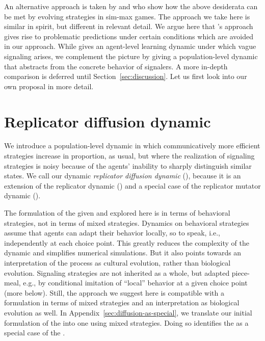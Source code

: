 \documentclass[fleqn,reqno,10pt]{article}
\newcommand{\rd}{\acro{rd}} %
\newcommand{\rmd}{\acro{rmd}} %
\newcommand{\rdd}{\acro{rdd}} %
\begin{document}
An alternative approach is taken by
\citet{FrankeJager2010:Vagueness-Signa} and
\citet{OConnor2013:The-Evolution-o} who show how the above desiderata
can be met by evolving strategies in sim-max games. The approach we
take here is similar in spirit, but different in relevant detail. We
argue here that \citeauthor{FrankeJager2010:Vagueness-Signa}'s
approach gives rise to problematic predictions under certain
conditions which are avoided in our approach. While
\citeauthor{OConnor2013:The-Evolution-o} gives an agent-level learning
dynamic under which vague signaling arises, we complement the picture
by giving a population-level dynamic that abstracts from the concrete
behavior of signalers. A more in-depth comparison is deferred until
Section~\ref{sec:discussion}. Let us first look into our own proposal
in more detail.



\section{Replicator diffusion dynamic}
\label{sec:repl-diff-dynam}

We introduce a population-level dynamic in which communicatively more
efficient strategies increase in proportion, as usual, but where the
realization of signaling strategies is noisy because of the agents'
inability to sharply distinguish similar states. We call our dynamic
\emph{replicator diffusion dynamic} (\rdd), because it is an extension
of the replicator dynamic (\rd) and a special case of the replicator
mutator dynamic (\rmd).

The formulation of the \rdd given and explored here is in terms of
behavioral strategies, not in terms of mixed strategies. Dynamics on
behavioral strategies assume that agents can adapt
their behavior locally, so to speak, i.e., independently at each
choice point. This greatly reduces the complexity of the dynamic and
simplifies numerical simulations. But it also points towards an
interpretation of the process as cultural evolution, rather than
biological evolution. Signaling strategies are not inherited as a
whole, but adapted piece-meal, e.g., by conditional imitation of
``local'' behavior at a given choice point (more below). Still, the
approach we suggest here is compatible with a formulation in terms of
mixed strategies and an interpretation as biological evolution as
well. In Appendix~\ref{sec:diffusion-as-special}, we
translate our initial formulation of the \rdd
into one using mixed strategies. Doing so identifies the \rdd as a
special case of the \rmd.
\end{document}
